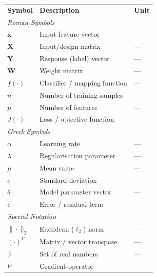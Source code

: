 
\begin{singlespace}
\begin{longtable}{lll}
\textbf{Symbol} & \textbf{Description} & \textbf{Unit} \\[0.5em]
\multicolumn{3}{l}{\textit{Roman Symbols}} \\[0.3em]
$\mathbf{x}$     & Input feature vector           & --- \\
$\mathbf{X}$     & Input/design matrix            & --- \\
$\mathbf{Y}$     & Response (label) vector        & --- \\
$\mathbf{W}$     & Weight matrix                  & --- \\
$f(\cdot)$       & Classifier / mapping function  & --- \\
$n$              & Number of training samples     & --- \\
$p$              & Number of features             & --- \\
$J(\cdot)$       & Loss / objective function      & --- \\[0.5em]
\multicolumn{3}{l}{\textit{Greek Symbols}} \\[0.3em]
$\alpha$         & Learning rate                  & --- \\
$\lambda$        & Regularisation parameter       & --- \\
$\mu$            & Mean value                     & --- \\
$\sigma$         & Standard deviation             & --- \\
$\theta$         & Model parameter vector         & --- \\
$\epsilon$       & Error / residual term          & --- \\[0.5em]
\multicolumn{3}{l}{\textit{Special Notation}} \\[0.3em]
$\|\cdot\|_2$    & Euclidean ($\ell_2$) norm      & --- \\
$(\cdot)^T$      & Matrix / vector transpose      & --- \\
$\mathbb{R}$     & Set of real numbers            & --- \\
$\nabla$         & Gradient operator              & --- \\
\end{longtable}
\end{singlespace}
\clearpage
